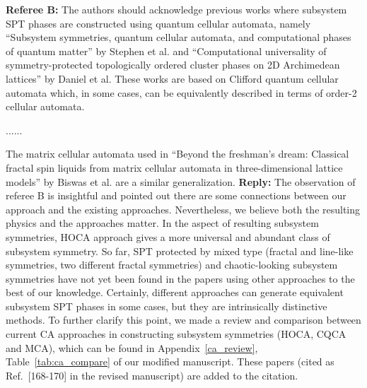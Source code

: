 \documentclass{article}
\begin{document}
\begin{tcolorbox}[title=Reply 5A (point-to-point reply), breakable]
\textbf{Referee B:}  The authors should acknowledge previous works where subsystem SPT phases are constructed using quantum cellular automata, namely
``Subsystem symmetries, quantum cellular automata, and computational
phases of quantum matter'' by Stephen et al. and ``Computational
universality of symmetry-protected topologically ordered cluster
phases on 2D Archimedean lattices'' by Daniel et al. These works are
based on Clifford quantum cellular automata which, in some cases, can
be equivalently described in terms of order-2 cellular automata.

......

The matrix cellular automata used in ``Beyond the freshman's dream: Classical fractal spin liquids from matrix cellular automata in
three-dimensional lattice models'' by Biswas et al. are a similar generalization.
\tcblower
\textbf{Reply:}
The observation of referee B is insightful and pointed out there are some connections between our approach and the existing approaches. Nevertheless, we believe both  the resulting physics and the approaches matter. In the aspect of resulting subsystem symmetries, HOCA approach gives a more universal and abundant class of subsystem symmetry. So far, SPT protected by mixed type (fractal and line-like symmetries, two different fractal symmetries) and chaotic-looking subsystem symmetries have not yet been found in the papers using other approaches to the best of our knowledge. Certainly,  different approaches can generate equivalent subsystem SPT phases in some cases, but they are intrinsically distinctive methods. To further clarify this point, we made a review and comparison between current CA approaches in constructing subsystem symmetries (HOCA, CQCA and MCA), which can be found in Appendix~\ref{ca_review}, Table~\ref{tab:ca_compare} of our modified manuscript. These papers (cited as Ref.~[168-170] in the revised manuscript) are added to the citation.
\end{tcolorbox}
\end{document}
